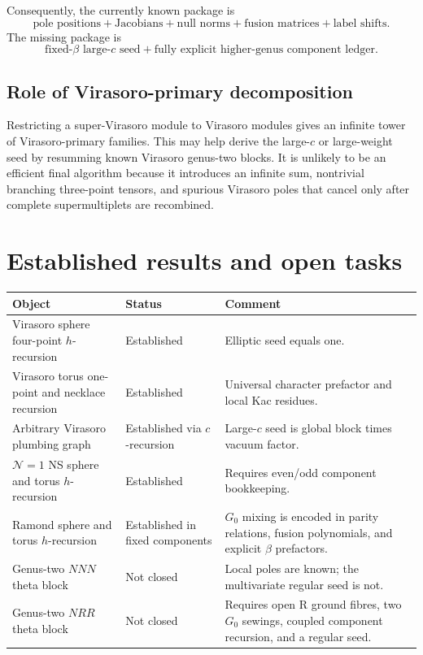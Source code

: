 \documentclass[11pt]{article}
\begin{document}
Consequently, the currently known package is
\begin{equation}
 \boxed{
 \text{pole positions}+\text{Jacobians}+\text{null norms}
 +\text{fusion matrices}+\text{label shifts}.}
\end{equation}
The missing package is
\begin{equation}
 \boxed{
 \text{fixed-\(\beta\) large-\(c\) seed}
 +\text{fully explicit higher-genus component ledger}.}
\end{equation}

\subsection{Role of Virasoro-primary decomposition}

Restricting a super-Virasoro module to Virasoro modules gives an infinite
tower of Virasoro-primary families.  This may help derive the large-\(c\) or
large-weight seed by resumming known Virasoro genus-two blocks.  It is
unlikely to be an efficient final algorithm because it introduces an
infinite sum, nontrivial branching three-point tensors, and spurious
Virasoro poles that cancel only after complete supermultiplets are
recombined.

\section{Established results and open tasks}

\begin{center}
\begin{tabularx}{\textwidth}{@{}L{0.28\textwidth}L{0.24\textwidth}X@{}}
\toprule
Object & Status & Comment\\
\midrule
Virasoro sphere four-point \(h\)-recursion &
Established &
Elliptic seed equals one.\\

Virasoro torus one-point and necklace recursion &
Established &
Universal character prefactor and local Kac residues.\\

Arbitrary Virasoro plumbing graph &
Established via \(c\)-recursion &
Large-\(c\) seed is global block times vacuum factor.\\

\(\mathcal N=1\) NS sphere and torus \(h\)-recursion &
Established &
Requires even/odd component bookkeeping.\\

Ramond sphere and torus \(h\)-recursion &
Established in fixed components &
\(G_0\) mixing is encoded in parity relations, fusion polynomials, and
explicit \(\beta\) prefactors.\\

Genus-two \(NNN\) theta block &
Not closed &
Local poles are known; the multivariate regular seed is not.\\

Genus-two \(NRR\) theta block &
Not closed &
Requires open R ground fibres, two \(G_0\) sewings, coupled component
recursion, and a regular seed.\\
\bottomrule
\end{tabularx}
\end{center}
\end{document}
